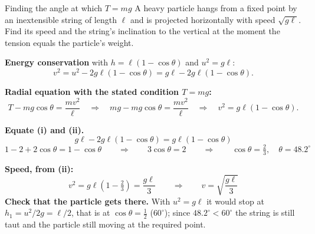 \begin{exbox}{Finding the angle at which $T=mg$}
A heavy particle hangs from a fixed point by an inextensible string of length $\ell$ and is projected
horizontally with speed $\sqrt{g\ell}$. Find its speed and the string's inclination to the vertical at the
moment the tension equals the particle's weight.

 \textbf{Energy conservation} with $h=\ell(1-\cos\theta)$ and $u^{2}=g\ell$:
\[
v^{2}=u^{2}-2g\ell(1-\cos\theta)=g\ell-2g\ell(1-\cos\theta). \tag{i}
\]

 \textbf{Radial equation with the stated condition $T=mg$:}
\[
T-mg\cos\theta=\frac{mv^{2}}{\ell}
\quad\Longrightarrow\quad
mg-mg\cos\theta=\frac{mv^{2}}{\ell}
\quad\Longrightarrow\quad
v^{2}=g\ell(1-\cos\theta). \tag{ii}
\]

 \textbf{Equate (i) and (ii).}
\[
g\ell-2g\ell(1-\cos\theta)=g\ell(1-\cos\theta)
\]
\[
1-2+2\cos\theta=1-\cos\theta
\qquad\Longrightarrow\qquad
3\cos\theta=2
\qquad\Longrightarrow\qquad
\boxed{\cos\theta=\tfrac{2}{3},\quad\theta=48.2^\circ}
\]

 \textbf{Speed, from (ii):}
\[
v^{2}=g\ell\left(1-\tfrac{2}{3}\right)=\frac{g\ell}{3}
\qquad\Longrightarrow\qquad
\boxed{v=\sqrt{\frac{g\ell}{3}}}
\]
\textbf{Check that the particle gets there.} With $u^{2}=g\ell$ it would stop at
$h_1=u^{2}/2g=\ell/2$, that is at $\cos\theta=\tfrac12$ ($60^\circ$); since $48.2^\circ<60^\circ$ the
string is still taut and the particle still moving at the required point.

\end{exbox}

